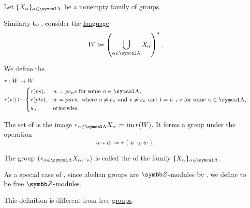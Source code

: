 \begin{definition}\label{def:group_free_product}\cite[323]{Knapp2016BAlg}
  Let \( \{ X_\al \}_{\al \in \CA} \) be a nonempty family of groups.

  Similarly to , consider the \hyperref[def:language]{language}
  \begin{equation*}
    W \coloneqq \left( \bigcup_{\al \in \CA} X_\al \right)^{*}.
  \end{equation*}

  We define the 
  \begin{align*}
    &r: W \to W \\
    &r(w) \coloneqq \begin{cases}
      r(ps), &w = p e_\al s \text{ for some } \al \in \CA, \\
      r(pts), &w = puvs, \text{ where } u \neq e_\al \text{ and } v \neq e_\al \text{ and } t = u \cdot_i v \text{ for some } \al \in \CA, \\
      w, &\text{otherwise}.
    \end{cases}
  \end{align*}

  The set of  is the image \( \ast_{\al \in \CA} X_\al \coloneqq \Img r(W) \). It forms a group under the operation
  \begin{equation*}
    u \cdot_\ast w \coloneqq r(u \cdot_{W} w).
  \end{equation*}

  The group \( (\ast_{\al \in \CA} X_\al, \cdot_\ast) \) is called the  of the family \( \{ X_\al \}_{\al \in \CA} \).
\end{definition}

\begin{definition}\label{def:free_abelian_group}
  As a special case of , since abelian groups are \( \BZ \)-modules by , we define  to be free \( \BZ \)-modules.

  This definition is different from free \hyperref[def:free_group]{groups}.
\end{definition}

